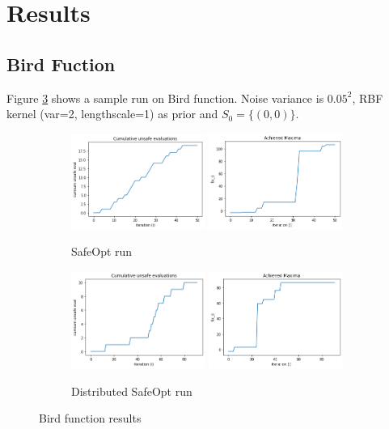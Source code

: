 \newpage
\section{Results}
\subsection{Bird Fuction}
Figure \ref{fig:bird-result} shows a sample run on Bird function. Noise variance is $0.05^2$, RBF kernel (var=2, lengthscale=1) as prior and $S_0=\{ (0,0) \}$.
\begin{figure}[h!]
	\centering
	\begin{subfigure}{0.99\textwidth}
		\includegraphics[width=0.48\textwidth]{figures/results/bird-sbo-cum-unsafe.png}
		\includegraphics[width=0.48\textwidth]{figures/results/bird-sbo-maxima.png}
		\caption{SafeOpt run}
		\label{fig:bird-result-sbo}
	\end{subfigure}
	\vfill
	\begin{subfigure}{0.98\textwidth}
		\includegraphics[width=0.48\textwidth]{figures/results/bird-dbo-cum-unsafe.png}
		\includegraphics[width=0.48\textwidth]{figures/results/bird-dbo-maxima.png}
		\caption{Distributed SafeOpt run}
		\label{fig:bird-result-dbo}
	\end{subfigure}
	\caption{Bird function results}
	\label{fig:bird-result}
\end{figure}

